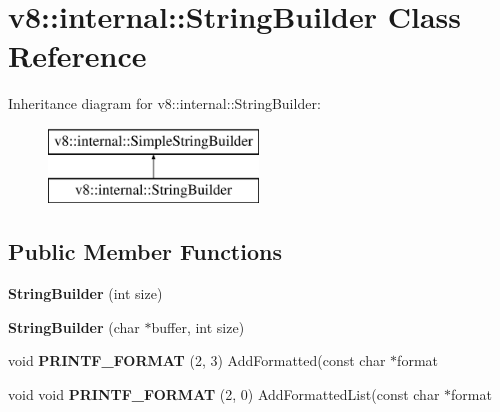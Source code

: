 \hypertarget{classv8_1_1internal_1_1_string_builder}{}\section{v8\+:\+:internal\+:\+:String\+Builder Class Reference}
\label{classv8_1_1internal_1_1_string_builder}
Inheritance diagram for v8\+:\+:internal\+:\+:String\+Builder\+:\begin{figure}[H]
\begin{center}
\leavevmode
\includegraphics[height=2.000000cm]{classv8_1_1internal_1_1_string_builder}
\end{center}
\end{figure}
\subsection*{Public Member Functions}
\begin{DoxyCompactItemize}
\item 
{\bfseries String\+Builder} (int size)\hypertarget{classv8_1_1internal_1_1_string_builder_a9bf748d9a19f14ade28d2f0d3367d1f7}{}\label{classv8_1_1internal_1_1_string_builder_a9bf748d9a19f14ade28d2f0d3367d1f7}

\item 
{\bfseries String\+Builder} (char $\ast$buffer, int size)\hypertarget{classv8_1_1internal_1_1_string_builder_ae084684be6d4361af9a5d1b8de2ff16d}{}\label{classv8_1_1internal_1_1_string_builder_ae084684be6d4361af9a5d1b8de2ff16d}

\item 
void {\bfseries P\+R\+I\+N\+T\+F\+\_\+\+F\+O\+R\+M\+AT} (2, 3) Add\+Formatted(const char $\ast$format\hypertarget{classv8_1_1internal_1_1_string_builder_a5823898923ae9c988a0b8073396ab162}{}\label{classv8_1_1internal_1_1_string_builder_a5823898923ae9c988a0b8073396ab162}

\item 
void void {\bfseries P\+R\+I\+N\+T\+F\+\_\+\+F\+O\+R\+M\+AT} (2, 0) Add\+Formatted\+List(const char $\ast$format\hypertarget{classv8_1_1internal_1_1_string_builder_a80ef5067c51aaa36ab53be62a99fc007}{}\label{classv8_1_1internal_1_1_string_builder_a80ef5067c51aaa36ab53be62a99fc007}

\end{DoxyCompactItemize}
